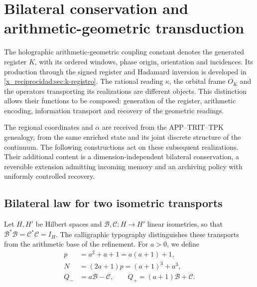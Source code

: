 \chapter{Bilateral conservation and arithmetic-geometric transduction}
\label{x_reciprocidad:lib04:bilateral}

The holographic arithmetic-geometric coupling constant denotes
the generated register \(K\), with its ordered windows, phase origin,
orientation and incidences. Its production through the signed register and
Hadamard inversion is developed in \cref{x_reciprocidad:sec:k-registro}.
The rational reading \(\kappa\), the orbital frame \(O_K\) and the
operators transporting its realizations are different objects.
This distinction allows their functions to be composed: generation of the register,
arithmetic encoding, information transport and recovery of the
geometric readings.

The regional coordinates and \(\alpha\) are received from the
APP--TRIT--TPK genealogy, from the same enriched state and its joint discrete
structure of the continuum. The following constructions act on these
subsequent realizations. Their additional content is a dimension-independent
bilateral conservation, a reversible extension admitting
incoming memory and an archiving policy with uniformly
controlled recovery.

\section{Bilateral law for two isometric transports}
\label{x_reciprocidad:lib04:ley}

Let \(H,H'\) be Hilbert spaces and
\(\mathcal B,\mathcal C:H\to H'\) linear isometries, so that
\(\mathcal B^*\mathcal B=\mathcal C^*\mathcal C=I_H\).
The calligraphic typography distinguishes these transports from the arithmetic
base of the refinement. For \(a>0\), we define
\begin{equation}
 \begin{aligned}
 p&=a^2+a+1=a(a+1)+1,\\
 N&=(2a+1)p=(a+1)^3+a^3,\\
 Q_-&=a\mathcal B-\mathcal C,\qquad
 Q_+=(a+1)\mathcal B+\mathcal C.
 \end{aligned}
 \label{x_reciprocidad:lib04:def-q}
\end{equation}

